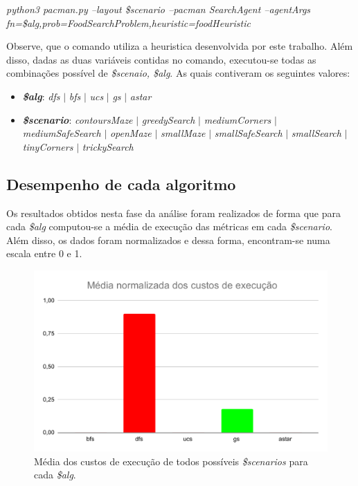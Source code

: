 \documentclass[12pt]{article}
\begin{document}
\begin{center}
  \textit{python3 pacman.py --layout \$scenario --pacman SearchAgent --agentArgs fn=\$alg,prob=FoodSearchProblem,heuristic=foodHeuristic}
\end{center}

Observe, que o comando utiliza a heuristica desenvolvida por este trabalho.
Além disso, dadas as duas variáveis contidas no comando, executou-se todas as
combinações possível de \textit{\$scenaio, \$alg}.
As quais contiveram os seguintes valores:
\begin{itemize}
  \item \textbf{\textit{\$alg}}: \textit{dfs} $|$ \textit{bfs} $|$ \textit{ucs} $|$ \textit{gs}
  $|$ \textit{astar}
  \item \textbf{\textit{\$scenario}}: \textit{contoursMaze} $|$ \textit{greedySearch} $|$
  \textit{mediumCorners} $|$ \textit{mediumSafeSearch} $|$ \textit{openMaze} $|$
  \textit{smallMaze} $|$ \textit{smallSafeSearch} $|$ \textit{smallSearch} $|$
  \textit{tinyCorners} $|$ \textit{trickySearch}
\end{itemize}

\subsection{Desempenho de cada algoritmo}
Os resultados obtidos nesta fase da análise foram realizados de forma que
para cada \textit{\$alg} computou-se a média de execução das métricas em cada
\textit{\$scenario}.
Além disso, os dados foram normalizados e dessa forma, encontram-se numa escala
entre 0 e 1.

\begin{figure}[hbt!]
  \centering
  \includegraphics[width=.8\textwidth]{fig/custo.pdf}
  \caption{Média dos custos de execução de todos possíveis \textit{\$scenarios} para cada \textit{\$alg}.}
  \label{fig:custo}
\end{figure}
\end{document}
